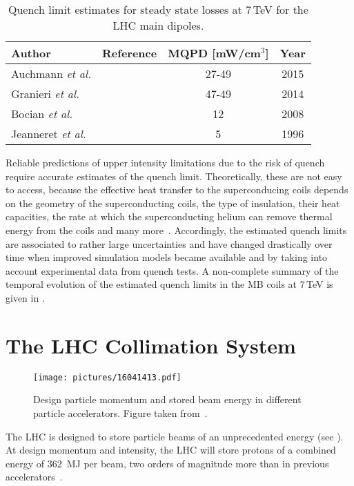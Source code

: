 \begin{table}[htbp]
  \centering
  \caption{Quench limit estimates for steady state losses at 7\,TeV for the LHC main dipoles.}
  \label{tab:quenchlim}
  \begin{tabular}{lccc} 
    \toprule
    Author           & Reference & MQPD {[}mW/cm$^{3}${]} & Year \\ \midrule
    Auchmann \textit{et al.} & \cite{PhysRevSTAB.18.061002}  & 27-49                  & 2015 \\
    Granieri \textit{et al.} & \cite{IEEE:granieri}          & 47-49                  & 2014 \\
    Bocian \textit{et al.} & \cite{IEEE:bocian}              & 12                     & 2008 \\
    Jeanneret \textit{et al.} & \cite{lhcprojreport44}       & 5                      & 1996 \\ \bottomrule
  \end{tabular}
\end{table}



Reliable predictions of upper intensity limitations due to the risk of quench require accurate estimates of the quench limit. Theoretically, these are not easy to access, because the effective heat transfer to the superconducing coils depends on the geometry of the superconducting coils, the type of insulation, their heat capacities, the rate at which the superconducting helium can remove thermal energy from the coils and many more~\cite{ipac13:THPEA045}. Accordingly, the estimated quench limits are associated to rather large uncertainties and have changed drastically over time when improved simulation models became available and by taking into account experimental data from quench tests. A non-complete summary of the temporal evolution of the estimated quench limits in the MB coils at $7\,$TeV is given in .






\section{The LHC Collimation System}\label{chap:3}
%
\begin{figure}[b]  
    \centering
    \texttt{[image: pictures/16041413.pdf]}
    \caption{Design particle momentum and stored beam energy in different particle accelerators. Figure taken from~\cite{collimationsystemref1}.}  
    \label{pic:16041401}
\end{figure}
%
The LHC is designed to store particle beams of an unprecedented energy (see ). At design momentum and intensity, the LHC will store protons of a combined energy of 362~MJ per beam, two orders of magnitude more than in previous accelerators~\cite{CERN-2004-003-V1,collimationsystemref1}. 

